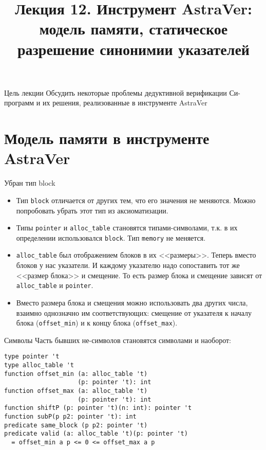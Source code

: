 \documentclass[hyperref={unicode=true}]{beamer}
\title{Лекция 12. Инструмент AstraVer: модель памяти,
статическое разрешение синонимии указателей}
\author{}
\date{}
\begin{document}
	\begin{frame}{}
		\titlepage
	\end{frame}

    \begin{frame}{Цель лекции}
    Обсудить некоторые проблемы дедуктивной верификации
    Си-программ и их решения, реализованные
    в инструменте AstraVer
    \end{frame}

    \section{Модель памяти в инструменте AstraVer}

    \begin{frame}{Убран тип block}
    \begin{itemize}
    \item
    Тип \texttt{block} отличается от других тем, что
    его значения не меняются. Можно попробовать убрать
    этот тип из аксиоматизации.
    \item
    Типы \texttt{pointer} и \texttt{alloc\_table}
    становятся типами-символами, т.к. в их определении
    использовался \texttt{block}. Тип \texttt{memory}
    не меняется.
    \item
    \texttt{alloc\_table} был отображением блоков в их
    <<размеры>>. Теперь вместо блоков у нас указатели.
    И каждому указателю надо сопоставить тот же <<размер
    блока>> и смещение. То есть размер блока и смещение
    зависят от \texttt{alloc\_table} и \texttt{pointer}.
    \item
    Вместо размера блока и смещения можно использовать
    два других числа, взаимно однозначно им соответствующих:
    смещение от указателя к началу блока (\texttt{offset\_min})
    и к концу блока (\texttt{offset\_max}).
    \end{itemize}
    \end{frame}

    \begin{frame}[fragile]{Символы}
    Часть бывших не-символов становятся символами и наоборот:
    \begin{lstlisting}
type pointer 't
type alloc_table 't
function offset_min (a: alloc_table 't)
                    (p: pointer 't): int
function offset_max (a: alloc_table 't)
                    (p: pointer 't): int
function shiftP (p: pointer 't)(n: int): pointer 't
function subP(p p2: pointer 't): int
predicate same_block (p p2: pointer 't)
predicate valid (a: alloc_table 't)(p: pointer 't)
  = offset_min a p <= 0 <= offset_max a p
    \end{lstlisting}
    \end{frame}
\end{document}

